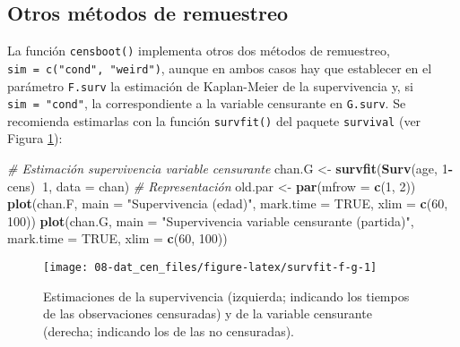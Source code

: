 \documentclass[
]{book}
\newenvironment{Shaded}{\begin{snugshade}}{\end{snugshade}}
\newcommand{\CommentTok}[1]{\textcolor[rgb]{0.56,0.35,0.01}{\textit{#1}}}
\newcommand{\DataTypeTok}[1]{\textcolor[rgb]{0.13,0.29,0.53}{#1}}
\newcommand{\DecValTok}[1]{\textcolor[rgb]{0.00,0.00,0.81}{#1}}
\newcommand{\KeywordTok}[1]{\textcolor[rgb]{0.13,0.29,0.53}{\textbf{#1}}}
\newcommand{\NormalTok}[1]{#1}
\newcommand{\OperatorTok}[1]{\textcolor[rgb]{0.81,0.36,0.00}{\textbf{#1}}}
\newcommand{\OtherTok}[1]{\textcolor[rgb]{0.56,0.35,0.01}{#1}}
\newcommand{\StringTok}[1]{\textcolor[rgb]{0.31,0.60,0.02}{#1}}
\theoremstyle{definition}
\theoremstyle{definition}
\theoremstyle{definition}
\theoremstyle{remark}
\begin{document}
\hypertarget{otros-muxe9todos-de-remuestreo}{%
\subsection{Otros métodos de remuestreo}\label{otros-muxe9todos-de-remuestreo}}

La función \texttt{censboot()} implementa otros dos métodos de remuestreo,
\texttt{sim\ =\ c("cond",\ "weird")}, aunque en ambos casos hay que establecer en el
parámetro \texttt{F.surv} la estimación de Kaplan-Meier de la supervivencia y,
si \texttt{sim\ =\ "cond"}, la correspondiente a la variable censurante en \texttt{G.surv}.
Se recomienda estimarlas con la función \texttt{survfit()} del paquete \texttt{survival}
(ver Figura \ref{fig:survfit-f-g}):

\begin{Shaded}
\begin{Highlighting}[]
\CommentTok{# Estimación supervivencia variable censurante}
\NormalTok{chan.G <-}\StringTok{ }\KeywordTok{survfit}\NormalTok{(}\KeywordTok{Surv}\NormalTok{(age, }\DecValTok{1}\OperatorTok{-}\NormalTok{cens)}\OperatorTok{~}\DecValTok{1}\NormalTok{, }\DataTypeTok{data =}\NormalTok{ chan)}
\CommentTok{# Representación}
\NormalTok{old.par <-}\StringTok{ }\KeywordTok{par}\NormalTok{(}\DataTypeTok{mfrow =} \KeywordTok{c}\NormalTok{(}\DecValTok{1}\NormalTok{, }\DecValTok{2}\NormalTok{))}
\KeywordTok{plot}\NormalTok{(chan.F, }\DataTypeTok{main =} \StringTok{"Supervivencia (edad)"}\NormalTok{, }\DataTypeTok{mark.time =} \OtherTok{TRUE}\NormalTok{, }
    \DataTypeTok{xlim =} \KeywordTok{c}\NormalTok{(}\DecValTok{60}\NormalTok{, }\DecValTok{100}\NormalTok{))}
\KeywordTok{plot}\NormalTok{(chan.G, }\DataTypeTok{main =} \StringTok{"Supervivencia variable censurante (partida)"}\NormalTok{, }
     \DataTypeTok{mark.time =} \OtherTok{TRUE}\NormalTok{, }\DataTypeTok{xlim =} \KeywordTok{c}\NormalTok{(}\DecValTok{60}\NormalTok{, }\DecValTok{100}\NormalTok{))}
\end{Highlighting}
\end{Shaded}

\begin{figure}[!htb]

{\centering \texttt{[image: 08-dat\_cen\_files/figure-latex/survfit-f-g-1]} 

}

\caption{Estimaciones de la supervivencia (izquierda; indicando los tiempos de las observaciones censuradas) y de la variable censurante (derecha; indicando los de las no censuradas).}\label{fig:survfit-f-g}
\end{figure}
\end{document}
